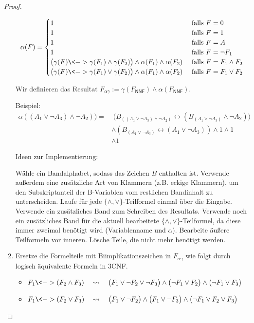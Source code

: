 \begin{proof}
\begin{enumerate}
 
 
 $$\alpha(F)=
 \begin{cases}
   1 & \text{ falls } F=0\\
   1 & \text{ falls } F=1\\
   1 & \text{ falls } F=A\\
   1 & \text{ falls } F=\neg F_1\\
   \big(\gamma(F)\<-> \gamma(F_1) \land \gamma(F_2)\big)\land\alpha(F_1)\land\alpha(F_2) & \text{ falls } F=F_1\land F_2\\
   \big(\gamma(F)\<-> \gamma(F_1) \lor \gamma(F_2)\big)\land\alpha(F_1)\land\alpha(F_2) & \text{ falls } F=F_1\lor F_2
  \end{cases}$$
  
  Wir definieren das Resultat $F_{\alpha\gamma}:=\gamma(F_\mathsf{NNF})\land \alpha(F_\mathsf{NNF})$.
  
  Beispiel:
  \begin{align*}
   \alpha((A_1\lor \neg A_3)\land \neg A_2)) = & \;
  \big(B_{((A_1\lor \neg A_3)\land \neg A_2)} \leftrightarrow (B_{(A_1\lor \neg A_3)} \land \neg A_2)\big)\\
  & \land (B_{(A_1\lor \neg A_3)} \leftrightarrow (A_1\lor \neg A_3)) \land 1 \land 1\\
  & \land 1
  \end{align*}

  
  Ideen zur Implementierung:
  
  Wähle ein Bandalphabet, sodass das Zeichen $B$ enthalten ist.
  Verwende außerdem eine zusätzliche Art von Klammern (z.B. eckige Klammern), um den Subskriptanteil der B-Variablen vom restlichen Bandinhalt zu unterscheiden.
  Laufe für jede $\{\land,\lor\}$-Teilformel einmal über die Eingabe.
  Verwende ein zusätzliches Band zum Schreiben des Resultats.
  Verwende noch ein zusätzliches Band für die aktuell bearbeitete $\{\land,\lor\}$-Teilformel, da diese immer zweimal benötigt wird (Variablenname und $\alpha$).
  Bearbeite äußere Teilformeln vor inneren.
  Lösche Teile, die nicht mehr benötigt werden.
\item Ersetze die Formelteile mit Biimplikationszeichen in $F_{\alpha\gamma}$ wie folgt durch logisch äquivalente Formeln in 3CNF.
	\begin{itemize}
	\item $F_1\<-> (F_2\land F_3)
		\quad\rightsquigarrow\quad \big(F_1\lor \neg F_2\lor \neg F_3\big)\land \big(\neg F_1\lor F_2\big)\land \big(\neg F_1\lor F_3\big)
		$
	\item $F_1\<-> (F_2\lor F_3)
		\quad\rightsquigarrow\quad \big(F_1\lor \neg F_2\big)\land\big(F_1\lor \neg F_3\big)\land \big(\neg F_1\lor F_2\lor F_3\big)
$
	\end{itemize}
	

\end{enumerate}
\end{proof}
